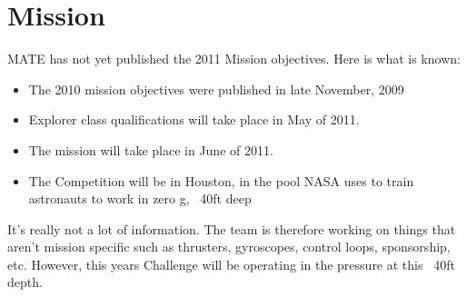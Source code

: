 \documentclass{proposalnsf}
\begin{document}
\section{Mission}

MATE has not yet published the 2011 Mission objectives. Here is what is known:
\begin{itemize}
\item The 2010 mission objectives were published in late November, 2009
\item Explorer class qualifications will take place in May of 2011.
\item The mission will take place in June of 2011.
\item The Competition will be in Houston, in the pool NASA uses to train astronauts to work in zero g, ~40ft deep
\end{itemize}
It's really not a lot of information. The team is therefore working on things that aren't mission specific such as thrusters, gyroscopes, control loops, sponsorship, etc.
However, this years Challenge will be operating in the pressure at this ~40ft depth.
\end{document}
